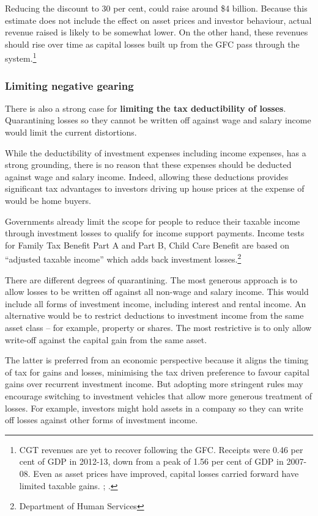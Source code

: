 \documentclass{grattan}\usepackage[]{graphicx}\usepackage[]{color}
\newcommand{\highlight}[1]{\textbf{#1}}
\begin{document}
Reducing the discount to 30 per cent, could raise around \$4 billion. Because this estimate does not include the effect on asset prices and investor behaviour, actual revenue raised is likely to be somewhat lower. On the other hand, these revenues should rise over time as capital losses built up from the GFC pass through the system.\footnote{CGT revenues are yet to recover following the GFC. Receipts were 0.46 per cent of GDP in 2012-13, down from a peak of 1.56 per cent of GDP in 2007-08. Even as asset prices have improved, capital losses carried forward have limited taxable gains. \textcite{Stewart2015}; \textcite{PBO2014}. }

\subsubsection{Limiting negative gearing}
There is also a strong case for \highlight{limiting the tax deductibility of losses}. Quarantining losses so they cannot be written off against wage and salary income would limit the current distortions. 

While the deductibility of investment expenses including income expenses, has a strong grounding, there is no reason that these expenses should be deducted against wage and salary income. Indeed, allowing these deductions provides significant tax advantages to investors driving up house prices at the expense of would be home buyers. 

Governments already limit the scope for people to reduce their taxable income through investment losses to qualify for income support payments. Income tests for Family Tax Benefit Part A and Part B, Child Care Benefit are based on ``adjusted taxable income'' which adds back investment losses.\footnote{Department of Human Services%
}

There are different degrees of quarantining. The most generous approach is to allow losses to be written off against all non-wage and salary income.  This would include all forms of investment income, including interest and rental income. An alternative would be to restrict deductions to investment income from the same asset class -- for example, property or shares. The most restrictive is to only allow write-off against the capital gain from the same asset. 

The latter is preferred from an economic perspective because it aligns the timing of tax for gains and losses, minimising the tax driven preference to favour capital gains over recurrent investment income. But adopting more stringent rules may encourage switching to investment vehicles that allow more generous treatment of losses. For example, investors might hold assets in a company so they can write off losses against other forms of investment income.  
\end{document}
